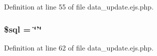 \-Definition at line 55 of file data\-\_\-update.\-ejs.\-php.

\hypertarget{patientfile_2immnunization_2data__update_8ejs_8php_a047170d6020a882807665812a27e2525}{
\subsubsection[{\$sql}]{\setlength{\rightskip}{0pt plus 5cm}\$sql = \char`\"{}'\char`\"{}}}\label{patientfile_2immnunization_2data__update_8ejs_8php_a047170d6020a882807665812a27e2525}


\-Definition at line 62 of file data\-\_\-update.\-ejs.\-php.

